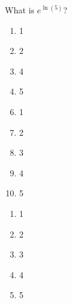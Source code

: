 


  What is $e^{\ln(5)}$?


\ifsat
	\begin{enumerate}[label=\Alph*)]
		\item  1
		\item  2
		\item 4
		\item   5%
	\end{enumerate}
\else
\fi

\ifacteven
	\begin{enumerate}[label=\textbf{\Alph*.},itemsep=\fill,align=left]
		\setcounter{enumii}{5}
		\item  1
		\item  2
		\item  3
		\addtocounter{enumii}{1}
		\item 4
		\item   5%
	\end{enumerate}
\else
\fi

\ifactodd
	\begin{enumerate}[label=\textbf{\Alph*.},itemsep=\fill,align=left]
		\item  1
		\item  2
		\item  3
		\item 4
		\item   5%
	\end{enumerate}
\else
\fi

%

\else
\fi

